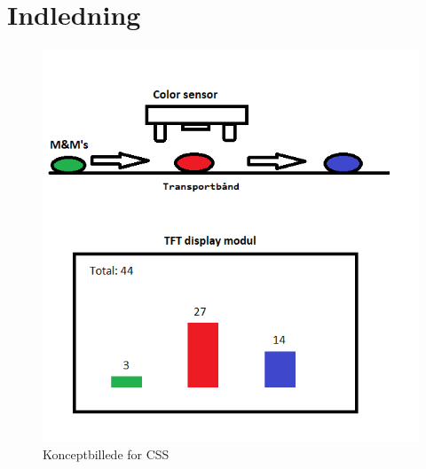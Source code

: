 \graphicspath{{Chapters/Indledning/}}

\section{Indledning}


\begin{figure}[H]
	\centering
	\includegraphics[width = 400pt]{Img/KonceptBillede}
	\caption{Konceptbillede for CSS}
	\label{fig:konceptbillede}
\end{figure}
	
\newpage

